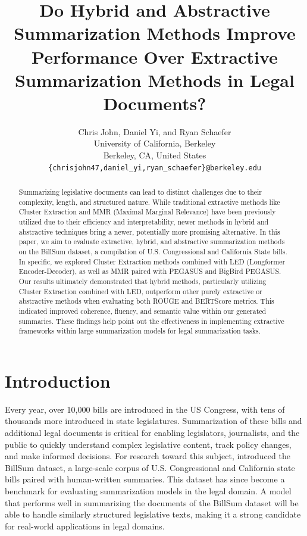 \documentclass[11pt]{article}
\title{Do Hybrid and Abstractive Summarization Methods Improve Performance Over Extractive Summarization Methods in Legal Documents?}
\author{Chris John, Daniel Yi, and Ryan Schaefer \\
  University of California, Berkeley \\
  Berkeley, CA, United States \\
  \texttt{\{chrisjohn47,daniel\_yi,ryan\_schaefer\}@berkeley.edu} }
\begin{document}
\maketitle
\begin{abstract}
Summarizing legislative documents can lead to distinct challenges due to their complexity, length, and structured nature. While traditional extractive methods like Cluster Extraction and MMR (Maximal Marginal Relevance) have been previously utilized due to their efficiency and interpretability, newer methods in hybrid and abstractive techniques bring a newer, potentially more promising alternative. In this paper, we aim to evaluate extractive, hybrid, and abstractive summarization methods on the BillSum dataset, a compilation of U.S. Congressional and California State bills. In specific, we explored Cluster Extraction methods combined with LED (Longformer Encoder-Decoder), as well as MMR paired with PEGASUS and BigBird PEGASUS. Our results ultimately demonstrated that hybrid methods, particularly utilizing Cluster Extraction combined with LED, outperform other purely extractive or abstractive methods when evaluating both ROUGE and BERTScore metrics. This indicated improved coherence, fluency, and semantic value within our generated summaries. These findings help point out the effectiveness in implementing extractive frameworks within large summarization models for legal summarization tasks.
\end{abstract}

\section{Introduction}

Every year, over 10,000 bills are introduced in the US Congress, with tens of thousands more introduced in state legislatures. Summarization of these bills and additional legal documents is critical for enabling legislators, journalists, and the public to quickly understand complex legislative content, track policy changes, and make informed decisions. For research toward this subject, \citet{Eidelman_2019} introduced the BillSum dataset, a large-scale corpus of U.S. Congressional and California state bills paired with human-written summaries. This dataset has since become a benchmark for evaluating summarization models in the legal domain. A model that performs well in summarizing the documents of the BillSum dataset will be able to handle similarly structured legislative texts, making it a strong candidate for real-world applications in legal domains.
\end{document}
